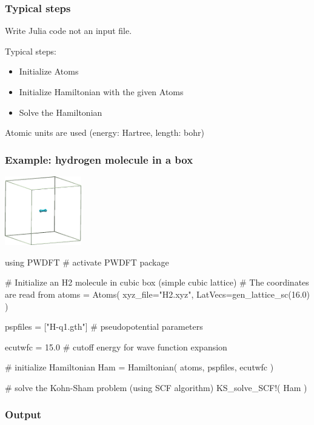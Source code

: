 \begin{frame}
\frametitle{Typical steps}

Write Julia code not an input file.

Typical steps:
\begin{itemize}
\item Initialize Atoms
\item Initialize Hamiltonian with the given Atoms
\item Solve the Hamiltonian
\end{itemize}

Atomic units are used (energy: Hartree, length: bohr)

\end{frame}


\begin{frame}[fragile]
\frametitle{Example: hydrogen molecule in a box}

{\centering
\includegraphics[width=0.25\textwidth]{codes/H2/H2.png}

}

\begin{juliacode}
using PWDFT # activate PWDFT package

# Initialize an H2 molecule in cubic box (simple cubic lattice)
# The coordinates are read from
atoms = Atoms( xyz_file="H2.xyz",
               LatVecs=gen_lattice_sc(16.0) )

pspfiles = ["H-q1.gth"] # pseudopotential parameters

ecutwfc = 15.0 # cutoff energy for wave function expansion

# initialize Hamiltonian
Ham = Hamiltonian( atoms, pspfiles, ecutwfc )

# solve the Kohn-Sham problem (using SCF algorithm)
KS_solve_SCF!( Ham )
\end{juliacode}


\end{frame}


\begin{frame}[fragile]
\frametitle{Output}


\end{frame}


